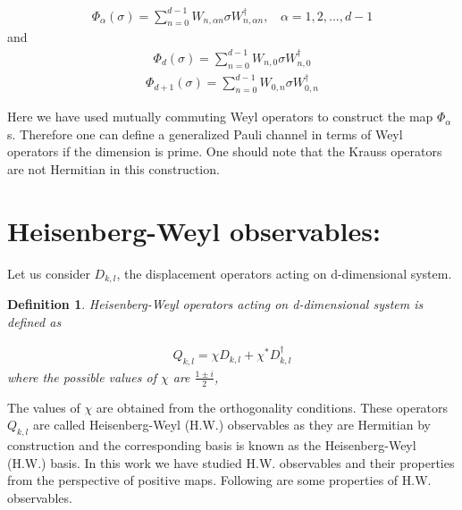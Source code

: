 \documentclass[12pt]{amsart}
\numberwithin{equation}{section}
\newtheorem{definition}{Definition}[section]
\begin{document}
\begin{eqnarray*}
    \Phi_{\alpha} (\sigma)=\sum_{n=0}^{d-1} W_{n,\alpha n} \sigma  W_{n,\alpha n}^{\dagger}, ~~~~\alpha=1,2,...,d-1
\end{eqnarray*}
and
\begin{eqnarray*}
    \Phi_d(\sigma)=\sum_{n=0}^{d-1} W_{n,0} \sigma  W_{n,0}^{\dagger}
\end{eqnarray*}
\begin{eqnarray*}
    \Phi_{d+1}(\sigma)=\sum_{n=0}^{d-1} W_{0,n} \sigma  W_{0,n}^{\dagger}
\end{eqnarray*}

Here we have used mutually commuting Weyl operators to construct the map $\Phi_{\alpha}$s. Therefore one can define a generalized Pauli channel in terms of Weyl operators if the dimension is prime. One should note that the Krauss operators are not Hermitian in this construction. 

\fi




\section{Heisenberg-Weyl observables: }\label{III}
  Let us consider $D_{k,l}$,  the displacement operators acting on d-dimensional system. \\
  
  \begin{definition} 
      Heisenberg-Weyl operators \cite{AEHK16} acting on d-dimensional system is defined as

      \begin{eqnarray*}
    Q_{k,l}= \chi D_{k,l} + \chi^{*} D^{\dagger}_{k,l}
\end{eqnarray*}
where the possible values of $\chi$ are $\frac{1\pm i}{2}$,
      
\end{definition}
  
 The values of $\chi$ are obtained from the orthogonality conditions. These operators $Q_{k,l}$ are called Heisenberg-Weyl (H.W.) observables as they are Hermitian by construction and the corresponding basis is known as the Heisenberg-Weyl (H.W.) basis. In this work we have studied H.W. observables and their properties from the perspective of positive maps. Following are some properties of H.W. observables.\\
\end{document}
